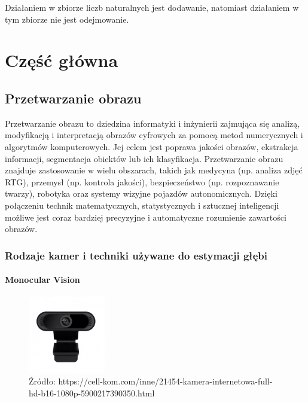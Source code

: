 \documentclass[magisterska]{pracadypl}
\begin{document}
  Działaniem w zbiorze liczb naturalnych jest dodawanie, natomiast działaniem w tym zbiorze nie jest odejmowanie.


\chapter{Część główna}

\section{Przetwarzanie obrazu}

Przetwarzanie obrazu to dziedzina informatyki i inżynierii zajmująca się analizą, modyfikacją i interpretacją obrazów cyfrowych za pomocą metod numerycznych i algorytmów komputerowych. Jej celem jest poprawa jakości obrazów, ekstrakcja informacji, segmentacja obiektów lub ich klasyfikacja. Przetwarzanie obrazu znajduje zastosowanie w wielu obszarach, takich jak medycyna (np. analiza zdjęć RTG), przemysł (np. kontrola jakości), bezpieczeństwo (np. rozpoznawanie twarzy), robotyka oraz systemy wizyjne pojazdów autonomicznych. Dzięki połączeniu technik matematycznych, statystycznych i sztucznej inteligencji możliwe jest coraz bardziej precyzyjne i automatyczne rozumienie zawartości obrazów.

\subsection{Rodzaje kamer i techniki używane do estymacji głębi}

\subsubsection{Monocular Vision}

\begin{figure}[h]  %
    \centering  %
    \includegraphics[width=0.3\textwidth]{images/MONO.jpg}  %
    \captionsetup{labelformat=empty, font=footnotesize}
    \caption{Źródło: https://cell-kom.com/inne/21454-kamera-internetowa-full-hd-b16-1080p-5900217390350.html}
    \label{fig:mono}  %
\end{figure}
\end{document}
